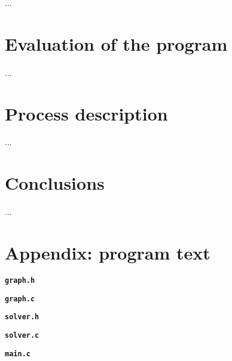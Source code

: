 \documentclass{adsrprt}
\begin{document}
...

\section{Evaluation of the program}

...

%

\section{Process description}

...

\section{Conclusions}

...

\section{Appendix: program text}


\texttt{\bfseries graph.h}


\texttt{\bfseries graph.c}


\texttt{\bfseries solver.h}


\texttt{\bfseries solver.c}


\texttt{\bfseries main.c}


%

%
\end{document}
